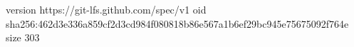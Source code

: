 version https://git-lfs.github.com/spec/v1
oid sha256:462d3e336a859cf2d3cd984f080818b86e567a1b6ef29bc945e75675092f764e
size 303
